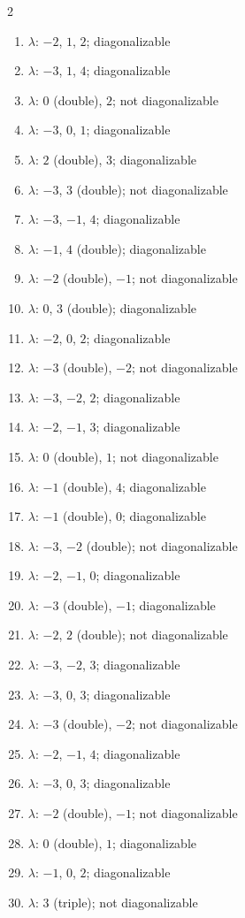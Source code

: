 \begin{multicols}{2}\raggedright
\begin{enumerate}[label=\arabic*., leftmargin=*, itemsep=1pt]
\item $\lambda$: $-2$, $1$, $2$; diagonalizable
\item $\lambda$: $-3$, $1$, $4$; diagonalizable
\item $\lambda$: $0$ (double), $2$; not diagonalizable
\item $\lambda$: $-3$, $0$, $1$; diagonalizable
\item $\lambda$: $2$ (double), $3$; diagonalizable
\item $\lambda$: $-3$, $3$ (double); not diagonalizable
\item $\lambda$: $-3$, $-1$, $4$; diagonalizable
\item $\lambda$: $-1$, $4$ (double); diagonalizable
\item $\lambda$: $-2$ (double), $-1$; not diagonalizable
\item $\lambda$: $0$, $3$ (double); diagonalizable
\item $\lambda$: $-2$, $0$, $2$; diagonalizable
\item $\lambda$: $-3$ (double), $-2$; not diagonalizable
\item $\lambda$: $-3$, $-2$, $2$; diagonalizable
\item $\lambda$: $-2$, $-1$, $3$; diagonalizable
\item $\lambda$: $0$ (double), $1$; not diagonalizable
\item $\lambda$: $-1$ (double), $4$; diagonalizable
\item $\lambda$: $-1$ (double), $0$; diagonalizable
\item $\lambda$: $-3$, $-2$ (double); not diagonalizable
\item $\lambda$: $-2$, $-1$, $0$; diagonalizable
\item $\lambda$: $-3$ (double), $-1$; diagonalizable
\item $\lambda$: $-2$, $2$ (double); not diagonalizable
\item $\lambda$: $-3$, $-2$, $3$; diagonalizable
\item $\lambda$: $-3$, $0$, $3$; diagonalizable
\item $\lambda$: $-3$ (double), $-2$; not diagonalizable
\item $\lambda$: $-2$, $-1$, $4$; diagonalizable
\item $\lambda$: $-3$, $0$, $3$; diagonalizable
\item $\lambda$: $-2$ (double), $-1$; not diagonalizable
\item $\lambda$: $0$ (double), $1$; diagonalizable
\item $\lambda$: $-1$, $0$, $2$; diagonalizable
\item $\lambda$: $3$ (triple); not diagonalizable
\end{enumerate}
\end{multicols}
